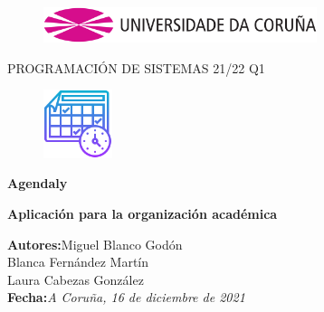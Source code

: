 \documentclass[a4paper,openright,12pt]{article}
\begin{document}
\begin{titlepage}

\begin{center}
\vspace*{-1in}
\begin{figure}[htb]
\begin{center}
\includegraphics[width=8cm]{udc.eps}
\end{center}
\end{figure}

\vspace*{1in}
PROGRAMACIÓN DE SISTEMAS 21/22 Q1\\


\begin{figure}[htb]
\begin{center}
\includegraphics[width=2cm]{icono.png}
\end{center}
\end{figure}
\begin{Large}
\textbf{Agendaly} \\
\end{Large}
\begin{Med}
\textbf{Aplicación para la organización académica} \\
\end{Med}

\vspace*{3in}

\begin{large}
\raggedleft
\textbf{Autores:}Miguel Blanco Godón \\
Blanca Fernández Martín\\
Laura Cabezas González\\
\textbf{Fecha:}\textit{A Coruña, 16 de diciembre de 2021}\\
\end{large}

\end{center}
\end{titlepage} 

\newpage

\end{document}
